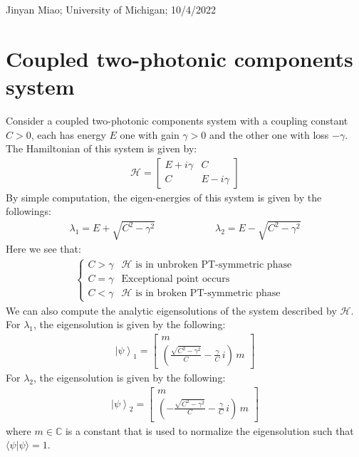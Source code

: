 \documentclass[1pt]{book}
\theoremstyle{break}
\theoremstyle{break}
\newcommand{\Complex}{\mathbb{C}}
\newcommand{\bmat}[1]{\begin{bmatrix} #1 \end{bmatrix}}
\begin{document}
Jinyan Miao;
University of Michigan;
10/4/2022

\section{Coupled two-photonic components system}
Consider a coupled two-photonic components system with a coupling constant $C > 0$, each has energy $E$ one with gain $\gamma > 0$ and the other one with loss $-\gamma$. The Hamiltonian of this system is given by:
\begin{align*}
\mathcal{H } = \bmat{E+i\gamma & C \\  C & E - i\gamma}
\end{align*}
By simple computation, the eigen-energies of this system is given by the followings:
\begin{align*}
\lambda_1 = E + \sqrt{C^2 -\gamma^2} \qquad\qquad\qquad \lambda_2 = E - \sqrt{C^2 - \gamma^2}
\end{align*}
Here we see that:
\begin{align*}
\begin{cases}
C > \gamma & \mathcal{H} \text{ is in unbroken PT-symmetric phase} \\
C = \gamma & \text{Exceptional point occurs} \\
C < \gamma & \mathcal{H} \text{ is in broken PT-symmetric phase}
\end{cases}
\end{align*}
We can also compute the analytic eigensolutions of the system described by $\mathcal{H}$. \\

For $\lambda_1$, the eigensolution is given by the following:
\begin{align*}
\left|\psi\right>_1 = \bmat{m \\  \left( \frac{\sqrt{C^2 - \gamma^2}}{C}-\frac{\gamma}{C}\, i\right)\, m }
\end{align*}
For $\lambda_2$, the eigensolution is given by the following:
\begin{align*}
\left|\psi\right>_2 = \bmat{m \\  \left(- \frac{\sqrt{C^2 - \gamma^2}}{C}-\frac{\gamma}{C} \, i \right)\, m}
\end{align*}
where $m\in \Complex$ is a constant that is used to normalize the eigensolution such that $\langle\psi |\psi\rangle = 1$. \\
\end{document}

